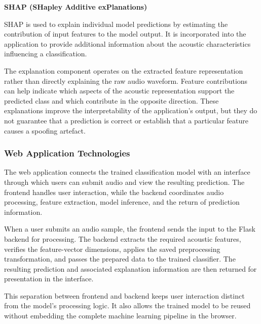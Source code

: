 \documentclass[12pt,a4paper]{report}
\begin{document}
\textbf{SHAP (SHapley Additive exPlanations)}

SHAP is used to explain individual model predictions by estimating the contribution of input features to the model output. It is incorporated into the application to provide additional information about the acoustic characteristics influencing a classification.

The explanation component operates on the extracted feature representation rather than directly explaining the raw audio waveform. Feature contributions can help indicate which aspects of the acoustic representation support the predicted class and which contribute in the opposite direction. These explanations improve the interpretability of the application's output, but they do not guarantee that a prediction is correct or establish that a particular feature causes a spoofing artefact.


\subsubsection{Web Application Technologies}

The web application connects the trained classification model with an interface through which users can submit audio and view the resulting prediction. The frontend handles user interaction, while the backend coordinates audio processing, feature extraction, model inference, and the return of prediction information.

When a user submits an audio sample, the frontend sends the input to the Flask backend for processing. The backend extracts the required acoustic features, verifies the feature-vector dimensions, applies the saved preprocessing transformation, and passes the prepared data to the trained classifier. The resulting prediction and associated explanation information are then returned for presentation in the interface.

This separation between frontend and backend keeps user interaction distinct from the model's processing logic. It also allows the trained model to be reused without embedding the complete machine learning pipeline in the browser.
\end{document}
